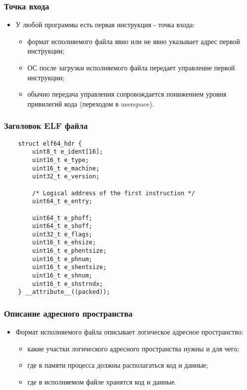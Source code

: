 \begin{frame}
\frametitle{Точка входа}
\begin{itemize}
    \item<1->У любой программы есть первая инструкция - точка входа:
    \begin{itemize}
        \item<2->формат исполняемого файла явно или не явно указывает адрес
             первой инструкции;
        \item<3->ОС после загрузки исполняемого файла передает управление первой
             инструкции;
        \item<4->обычно передача управления сопровождается понижением уровня
             привилегий кода (переходом в userspace).
    \end{itemize}
\end{itemize}
\end{frame}

\begin{frame}[fragile]
\frametitle{Заголовок ELF файла}
\begin{lstlisting}
    struct elf64_hdr {
        uint8_t e_ident[16];
        uint16_t e_type;
        uint16_t e_machine;
        uint32_t e_version;

        /* Logical address of the first instruction */
        uint64_t e_entry;

        uint64_t e_phoff;
        uint64_t e_shoff;
        uint32_t e_flags;
        uint16_t e_ehsize;
        uint16_t e_phentsize;
        uint16_t e_phnum;
        uint16_t e_shentsize;
        uint16_t e_shnum;
        uint16_t e_shstrndx;
    } __attribute__((packed));
\end{lstlisting}
\end{frame}

\begin{frame}
\frametitle{Описание адресного пространства}
\begin{itemize}
    \item<1->Формат исполняемого файла описывает логическое адресное
         пространство:
    \begin{itemize}
        \item<2->какие участки логического адресного пространства нужны
             и для чего;
        \item<3->где в памяти процесса должны располагаться код и данные;
        \item<4->где в исполняемом файле хранятся код и данные.
    \end{itemize}
\end{itemize}
\end{frame}

